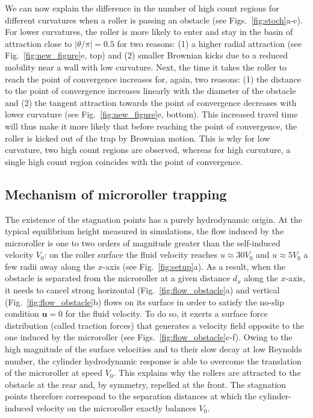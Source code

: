 \documentclass[12pt]{article}
\newcommand{\bs}[1]{\boldsymbol{#1}}
\def\bu{\bs{u}}
\begin{document}
We can now explain the difference in the number of high count regions for different curvatures when a roller is passing an obstacle (see Figs.~\ref{fig:stoch}a-c). 
For lower curvatures, the roller is more likely to enter and stay in the basin of attraction close to $|\theta / \pi | = 0.5$  for two reasons: (1) a higher radial attraction (see Fig.~\ref{fig:new_figure}e, top) and (2) smaller Brownian kicks due to a reduced mobility near a wall with low curvature.
Next, the time it takes the roller to reach the point of convergence increases for, again, two reasons: (1) the distance to the point of convergence increases linearly with the diameter of the obstacle and (2) the tangent attraction towards the point of convergence decreases with lower curvature (see Fig.~\ref{fig:new_figure}e, bottom). This increased travel time will thus make it more likely that before reaching the point of convergence, the roller is kicked out of the trap by Brownian motion. This is why for low curvature, two high count regions are observed, whereas for high curvature, a single high count region coincides with the point of convergence.




\subsection*{Mechanism of microroller trapping}
The existence of the stagnation points has a purely hydrodynamic origin. At the typical equilibrium height measured in simulations, the flow induced by the microroller is one to two orders of magnitude greater than the self-induced velocity $V_0$: on the roller surface the fluid velocity reaches $u \approx 30V_0$ and $u \approx 5 V_0$ a few radii away along the $x$-axis (see Fig.~\ref{fig:setup}a). As a result, when the obstacle is separated from the microroller at a given distance $d_x$ along the $x$-axis, it needs to cancel strong horizontal (Fig.~\ref{fig:flow_obstacle}a) and vertical (Fig.~\ref{fig:flow_obstacle}b) flows on its surface in order to satisfy the no-slip condition $\bu=0$ for the fluid velocity.  
To do so, it exerts a surface force distribution (called traction forces) that generates a velocity field opposite to the one induced by the microroller (see Figs.~\ref{fig:flow_obstacle}c-f).  Owing to the high magnitude of the surface velocities and to their slow decay at low Reynolds number, the cylinder hydrodynamic response is able to overcome the translation of the microroller at speed $V_0$. This explains why the rollers are attracted to the obstacle at the rear and, by symmetry, repelled at the front. The stagnation points therefore  correspond to the separation distances at which the cylinder-induced velocity on the microroller exactly balances $V_0$.  
\end{document}
